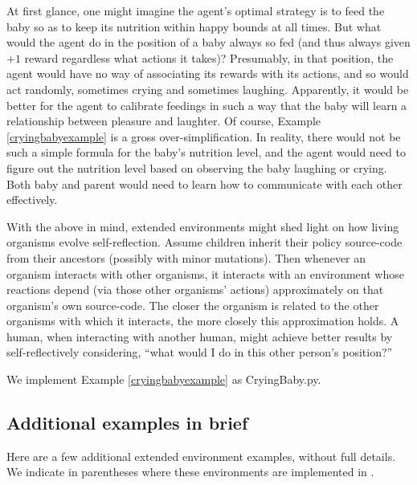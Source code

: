 \documentclass{article}
\begin{document}
At first glance, one might imagine the agent's optimal strategy is to feed the baby
so as to keep its nutrition within happy bounds at all times. But what would the
agent do in the position of a baby always so fed (and thus always given $+1$ reward
regardless what actions it takes)? Presumably, in that position, the agent would have
no way of associating its rewards with its actions, and so would act randomly,
sometimes crying and sometimes laughing. Apparently, it would be better for the agent
to calibrate feedings in such a way that the baby will learn a relationship
between pleasure and laughter. Of course, Example \ref{cryingbabyexample} is a gross
over-simplification. In reality, there would not be such a simple formula for the
baby's nutrition level, and the agent would need to figure out the nutrition level
based on observing the baby laughing or crying. Both baby and parent would need to
learn how to communicate with each other effectively.

With the above in mind, extended environments might shed light on how living organisms
evolve self-reflection. Assume children inherit their policy source-code from their ancestors
(possibly with minor mutations). Then whenever an organism interacts with other organisms,
it interacts with an environment whose reactions depend (via those other organisms' actions)
approximately on that organism's own source-code. The closer the organism is related
to the other organisms with which it interacts, the more closely this approximation holds.
A human, when interacting with another human, might achieve better results by self-reflectively
considering, ``what would I do in this other person's position?''

We implement Example \ref{cryingbabyexample} as CryingBaby.py.

\subsection{Additional examples in brief}

Here are a few additional extended environment examples, without full details.
We indicate in parentheses where these environments are implemented in \cite{library}.
\end{document}
